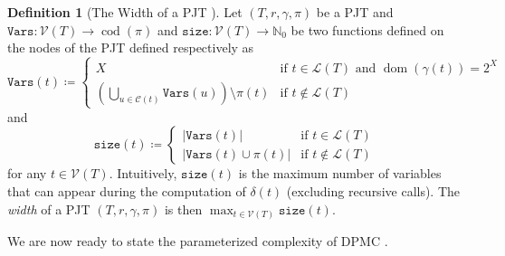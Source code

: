 \documentclass{article}
\theoremstyle{definition}
\newtheorem{definition}{Definition}
\theoremstyle{remark}
\DeclareMathOperator{\dom}{dom}
\DeclareMathOperator{\cod}{cod}
\begin{document}
\begin{definition}[The Width of a PJT
  \cite{DBLP:conf/cp/DudekPV20}] \label{def:size}
  Let $(T, r, \gamma, \pi)$ be a PJT and $\mathtt{Vars}\colon \mathcal{V}(T) \to
  \cod(\pi)$ and $\mathtt{size}\colon \mathcal{V}(T) \to \mathbb{N}_0$ be two
  functions defined on the nodes of the PJT defined respectively as
  \[
    \mathtt{Vars}(t) \coloneqq
    \begin{cases}
      X & \text{if } t \in \mathcal{L}(T) \text{ and } \dom(\gamma(t)) = 2^X
      \\
      \left( \bigcup_{u \in \mathcal{C}(t)} \mathtt{Vars}(u) \right) \setminus
      \pi(t) & \text{if } t \not\in \mathcal{L}(T)
    \end{cases}
  \]
  and
  \[
    \mathtt{size}(t) \coloneqq
    \begin{cases}
      |\mathtt{Vars}(t)| & \text{if } t \in \mathcal{L}(T) \\
      |\mathtt{Vars}(t) \cup \pi(t)| & \text{if } t \not\in \mathcal{L}(T)
    \end{cases}
  \]
  for any $t \in \mathcal{V}(T)$. Intuitively, $\mathtt{size}(t)$ is the maximum
  number of variables that can appear during the computation of $\delta(t)$
  (excluding recursive calls). The \emph{width} of a PJT $(T, r, \gamma, \pi)$
  is then $\max_{t \in \mathcal{V}(T)} \mathtt{size}(t)$.
\end{definition}

We are now ready to state the parameterized complexity of \textsc{DPMC}
\cite{DBLP:conf/cp/DudekPV20}.
\end{document}
